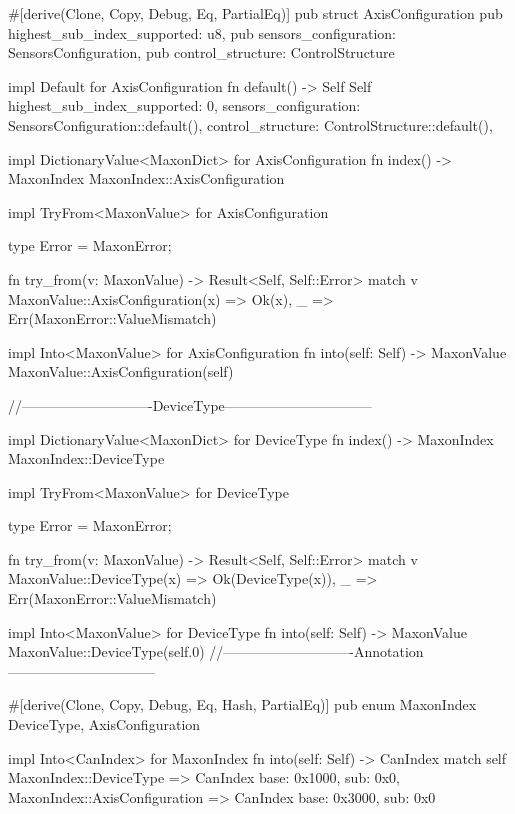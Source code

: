 \documentclass[a4paper,12pt]{article}
\begin{document}
\begin{appendices}
\begin{flushleft}
\begin{MyCodes}
#[derive(Clone, Copy, Debug, Eq, PartialEq)]
pub struct AxisConfiguration {
    pub highest_sub_index_supported: u8,
    pub sensors_configuration: SensorsConfiguration,
    pub control_structure: ControlStructure
}

impl Default for AxisConfiguration {
    fn default() -> Self {
        Self {
            highest_sub_index_supported: 0,
            sensors_configuration: SensorsConfiguration::default(),
            control_structure: ControlStructure::default(),
        }
    }
}

impl DictionaryValue<MaxonDict> for AxisConfiguration {
    fn index() -> MaxonIndex {
        MaxonIndex::AxisConfiguration
    }
}

impl TryFrom<MaxonValue> for AxisConfiguration {
    type Error = MaxonError;

    fn try_from(v: MaxonValue) -> Result<Self, Self::Error> {
        match v {
            MaxonValue::AxisConfiguration(x) => Ok(x),
            _ => Err(MaxonError::ValueMismatch)
        }
    }
}

impl Into<MaxonValue> for AxisConfiguration {
    fn into(self: Self) -> MaxonValue {
        MaxonValue::AxisConfiguration(self)
    }
}

//----------------------------DeviceType--------------------------------

impl DictionaryValue<MaxonDict> for DeviceType {
    fn index() -> MaxonIndex {
        MaxonIndex::DeviceType
    }
}

impl TryFrom<MaxonValue> for DeviceType {
    type Error = MaxonError;

    fn try_from(v: MaxonValue) -> Result<Self, Self::Error> {
        match v {
            MaxonValue::DeviceType(x) => Ok(DeviceType(x)),
            _ => Err(MaxonError::ValueMismatch)
        }
    }
}

impl Into<MaxonValue> for DeviceType {
    fn into(self: Self) -> MaxonValue {
        MaxonValue::DeviceType(self.0)
    }
}
//----------------------------Annotation--------------------------------

#[derive(Clone, Copy, Debug, Eq, Hash, PartialEq)]
pub enum MaxonIndex {
    DeviceType,
    AxisConfiguration
}

impl Into<CanIndex> for MaxonIndex {
    fn into(self: Self) -> CanIndex {
        match self {
            MaxonIndex::DeviceType => CanIndex {base: 0x1000, sub: 0x0},
            MaxonIndex::AxisConfiguration => CanIndex {base: 0x3000, sub: 0x0}
        }
    }
}


\end{MyCodes}
\end{flushleft}
\end{appendices}
\end{document}
